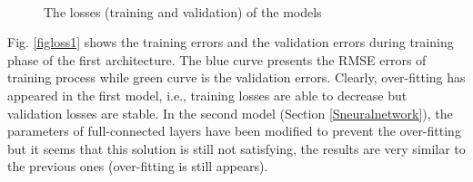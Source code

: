 \documentclass[review]{elsarticle}
\begin{document}
\begin{figure}[htbp]
    \centering
    ~~
\\    
    \caption{The losses (training and validation) of the models}
    \label{figlosses}
\end{figure}

Fig. \ref{figloss1} shows the training errors and the validation errors during training phase of the first architecture. The blue curve presents the RMSE errors of training process while green curve is the validation errors. Clearly, over-fitting has appeared in the first model, i.e., training losses are able to decrease but validation losses are stable. In the second model (Section \ref{Sneuralnetwork}), the parameters of full-connected layers have been modified to prevent the over-fitting but it seems that this solution is still not satisfying, the results are very similar to the previous ones (over-fitting is still appears).
\end{document}
